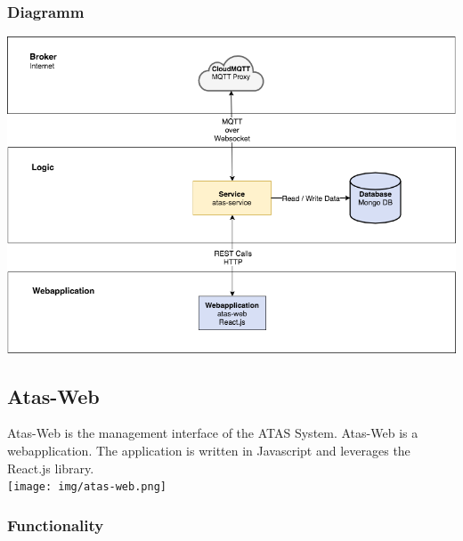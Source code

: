 \documentclass[a4paper,11pt, oneside]{report}
\theoremstyle{definition}
\begin{document}
\subsubsection{Diagramm}
\includegraphics[width=\textwidth]{img/ATAS_SystemOverview_Detail_atasservice.png}

\newpage
\subsection{Atas-Web}
Atas-Web is the management interface of the ATAS System. Atas-Web is a webapplication. The application is written in Javascript and leverages the React.js library.\\[0.3cm]

\texttt{[image: img/atas-web.png]}

\newpage
\subsubsection{Functionality}
\end{document}

